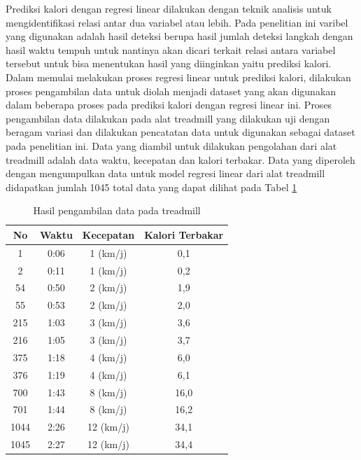 Prediksi kalori dengan regresi linear dilakukan dengan teknik analisis untuk mengidentifikasi relasi antar dua variabel atau lebih. Pada penelitian ini varibel yang digunakan adalah hasil deteksi berupa hasil jumlah deteksi langkah dengan hasil waktu tempuh untuk nantinya akan dicari terkait relasi antara variabel tersebut untuk bisa menentukan hasil yang diinginkan yaitu prediksi kalori. Dalam memulai melakukan proses regresi linear untuk prediksi kalori, dilakukan proses pengambilan data untuk diolah menjadi dataset yang akan digunakan dalam beberapa proses pada prediksi kalori dengan regresi linear ini. Proses pengambilan data dilakukan pada alat treadmill yang dilakukan uji dengan beragam variasi dan dilakukan pencatatan data untuk digunakan sebagai dataset pada penelitian ini. Data yang diambil untuk dilakukan pengolahan dari alat treadmill adalah data waktu, kecepatan dan kalori terbakar. Data yang diperoleh dengan mengumpulkan data untuk model regresi linear dari alat treadmill didapatkan jumlah 1045 total data yang dapat dilihat pada Tabel \ref{tb:DatasetRegresi}

\begin{longtable}{|c|c|c|c|}
  \caption{Hasil pengambilan data pada treadmill}
  \label{tb:DatasetRegresi}                                   \\
  \hline
  \rowcolor[HTML]{C0C0C0}
  \textbf{No} & \textbf{Waktu} & \textbf{Kecepatan} & \textbf{Kalori Terbakar} \\
  \hline
  1   & 0:06    & 1 (km/j)    & 0,1     \\
  \hline
  2   & 0:11    & 1 (km/j)    & 0,2     \\
  \hline
  54   & 0:50    & 2 (km/j)    & 1,9     \\
  \hline
  55   & 0:53    & 2 (km/j)    & 2,0     \\
  \hline
  215   & 1:03    & 3 (km/j)    & 3,6     \\
  \hline
  216   & 1:05    & 3 (km/j)    & 3,7     \\
  \hline
  375   & 1:18    & 4 (km/j)    & 6,0     \\
  \hline
  376   & 1:19    & 4 (km/j)    & 6,1     \\
  \hline
  700   & 1:43    & 8 (km/j)    & 16,0     \\
  \hline
  701   & 1:44    & 8 (km/j)    & 16,2     \\
  \hline
  1044   & 2:26    & 12 (km/j)    & 34,1     \\
  \hline
  1045   & 2:27    & 12 (km/j)    & 34,4     \\
  \hline
\end{longtable}

